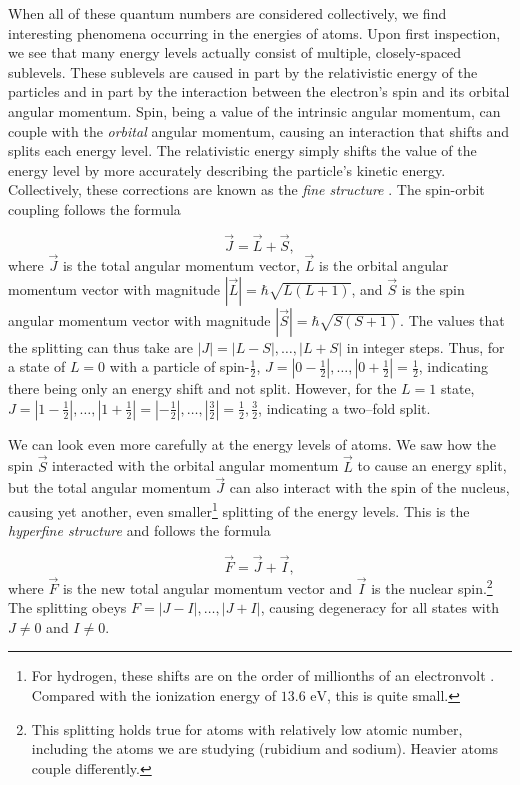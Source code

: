 When all of these quantum numbers are considered collectively, we find interesting phenomena occurring in the energies of atoms. Upon first inspection, we see that many energy levels actually consist of multiple, closely-spaced sublevels. These sublevels are caused in part by the relativistic energy of the particles and in part by the interaction between the electron's spin and its orbital angular momentum. Spin, being a value of the intrinsic angular momentum, can couple with the \textit{orbital} angular momentum, causing an interaction that shifts and splits each energy level. The relativistic energy simply shifts the value of the energy level by more accurately describing the particle's kinetic energy. Collectively, these corrections are known as the \textit{fine structure} \cite{Kibblewhite2009}. The spin-orbit coupling follows the formula 

\begin{equation}
  \vec J = \vec L + \vec S,
  \label{fineequation}
\end{equation}
%
where $\vec J$ is the total angular momentum vector, $\vec L$ is the orbital angular momentum vector with magnitude $|\vec L| = \hbar \sqrt{L (L + 1)}$, and $\vec S$ is the spin angular momentum vector with magnitude $|\vec S| = \hbar \sqrt{S(S+1)}$. The values that the splitting can thus take are $|J| = |L - S|, \dots, |L +S|$ in integer steps. Thus, for a state of $L=0$ with a particle of spin-$\frac{1}{2}$, $J = |0-\frac{1}{2}|, \dots, |0+\frac{1}{2}| = \frac{1}{2}$, indicating there being only an energy shift and not split. However, for the $L=1$ state, $J = |1-\frac{1}{2}|,\dots, |1+\frac{1}{2}| = |-\frac{1}{2}|, \dots, |\frac{3}{2}| =  \frac{1}{2}, \frac{3}{2}$, indicating a two--fold split.


We can look even more carefully at the energy levels of atoms. We saw how the spin $\vec S$ interacted with the orbital angular momentum $\vec L$ to cause an energy split, but the total angular momentum $\vec J$ can also interact with the spin of the nucleus, causing yet another, even smaller\footnote{For hydrogen, these shifts are on the order of millionths of an electronvolt \cite{feynman}. Compared with the ionization energy of $13.6 \text{ eV}$, this is quite small.} splitting of the energy levels. This is the \textit{hyperfine structure} and follows the formula

\begin{equation}
\vec F = \vec J + \vec I,
  \label{hyperfine}
\end{equation}
%
where $\vec F$ is the new total angular momentum vector and $\vec I$ is the nuclear spin.\footnote{This splitting holds true for atoms with relatively low atomic number, including the atoms we are studying (rubidium and sodium). Heavier atoms couple differently.} The splitting obeys $F = |J-I|, \dots, |J+I|$, causing degeneracy for all states with $J \neq 0$ and $I \neq 0$.

